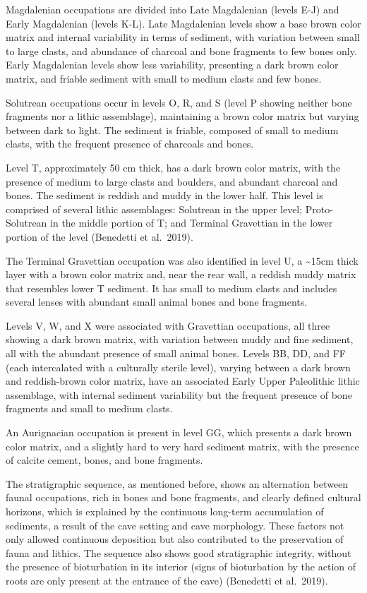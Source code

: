 \documentclass[12pt,twoside]{reedthesis}
\begin{document}
Magdalenian occupations are divided into Late Magdalenian (levels E-J) and Early Magdalenian (levels K-L). Late Magdalenian levels show a base brown color matrix and internal variability in terms of sediment, with variation between small to large clasts, and abundance of charcoal and bone fragments to few bones only. Early Magdalenian levels show less variability, presenting a dark brown color matrix, and friable sediment with small to medium clasts and few bones.

Solutrean occupations occur in levels O, R, and S (level P showing neither bone fragments nor a lithic assemblage), maintaining a brown color matrix but varying between dark to light. The sediment is friable, composed of small to medium clasts, with the frequent presence of charcoals and bones.

Level T, approximately 50 cm thick, has a dark brown color matrix, with the presence of medium to large clasts and boulders, and abundant charcoal and bones. The sediment is reddish and muddy in the lower half. This level is comprised of several lithic assemblages: Solutrean in the upper level; Proto-Solutrean in the middle portion of T; and Terminal Gravettian in the lower portion of the level (Benedetti et al.~2019).

The Terminal Gravettian occupation was also identified in level U, a \textasciitilde15cm thick layer with a brown color matrix and, near the rear wall, a reddish muddy matrix that resembles lower T sediment. It has small to medium clasts and includes several lenses with abundant small animal bones and bone fragments.

Levels V, W, and X were associated with Gravettian occupations, all three showing a dark brown matrix, with variation between muddy and fine sediment, all with the abundant presence of small animal bones.
Levels BB, DD, and FF (each intercalated with a culturally sterile level), varying between a dark brown and reddish-brown color matrix, have an associated Early Upper Paleolithic lithic assemblage, with internal sediment variability but the frequent presence of bone fragments and small to medium clasts.

An Aurignacian occupation is present in level GG, which presents a dark brown color matrix, and a slightly hard to very hard sediment matrix, with the presence of calcite cement, bones, and bone fragments.

The stratigraphic sequence, as mentioned before, shows an alternation between faunal occupations, rich in bones and bone fragments, and clearly defined cultural horizons, which is explained by the continuous long-term accumulation of sediments, a result of the cave setting and cave morphology. These factors not only allowed continuous deposition but also contributed to the preservation of fauna and lithics. The sequence also shows good stratigraphic integrity, without the presence of bioturbation in its interior (signs of bioturbation by the action of roots are only present at the entrance of the cave) (Benedetti et al.~2019).
\end{document}
